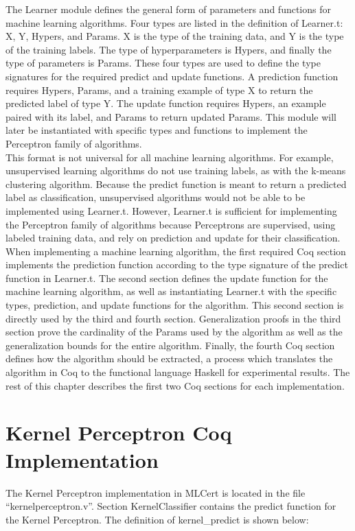 The Learner module defines the general form of parameters and functions for machine learning algorithms. Four types are listed in the definition of Learner.t: X, Y, Hypers, and Params. X is the type of the training data, and Y is the type of the training labels. The type of hyperparameters is Hypers, and finally the type of parameters is Params. These four types are used to define the type signatures for the required predict and update functions. A prediction function requires Hypers, Params, and a training example of type X to return the predicted label of type Y. The update function requires Hypers, an example paired with its label, and Params to return updated Params. This module will later be instantiated with specific types and functions to implement the Perceptron family of algorithms. 
\\This format is not universal for all machine learning algorithms. For example, unsupervised learning algorithms do not use training labels, as with the k-means clustering algorithm. Because the predict function is meant to return a predicted label as classification, unsupervised algorithms would not be able to be implemented using Learner.t. However, Learner.t is sufficient for implementing the Perceptron family of algorithms because Perceptrons are supervised, using labeled training data, and rely on prediction and update for their classification.
\\When implementing a machine learning algorithm, the first required Coq section implements the prediction function according to the type signature of the predict function in Learner.t. The second section defines the update function for the machine learning algorithm, as well as instantiating Learner.t with the specific types, prediction, and update functions for the algorithm. This second section is directly used by the third and fourth section. Generalization proofs in the third section prove the cardinality of the Params used by the algorithm as well as the generalization bounds for the entire algorithm. Finally, the fourth Coq section defines how the algorithm should be extracted, a process which translates the algorithm in Coq to the functional language Haskell for experimental results. The rest of this chapter describes the first two Coq sections for each implementation.
\section{Kernel Perceptron Coq Implementation}\label{KPCoqImp}
The Kernel Perceptron implementation in MLCert is located in the file ``kernelperceptron.v''. Section KernelClassifier contains the predict function for the Kernel Perceptron. The definition of kernel\_predict is shown below:

